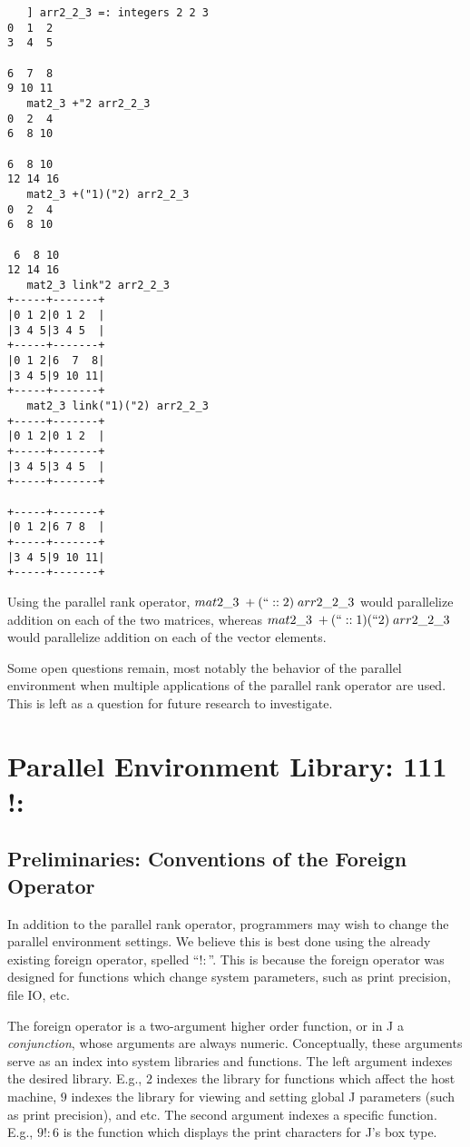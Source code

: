 \begin{singlespacing}
\begin{small}
\begin{verbatim}
   ] arr2_2_3 =: integers 2 2 3
0  1  2
3  4  5

6  7  8
9 10 11
   mat2_3 +"2 arr2_2_3
0  2  4
6  8 10

6  8 10
12 14 16
   mat2_3 +("1)("2) arr2_2_3
0  2  4
6  8 10

 6  8 10
12 14 16
   mat2_3 link"2 arr2_2_3
+-----+-------+
|0 1 2|0 1 2  |
|3 4 5|3 4 5  |
+-----+-------+
|0 1 2|6  7  8|
|3 4 5|9 10 11|
+-----+-------+
   mat2_3 link("1)("2) arr2_2_3
+-----+-------+
|0 1 2|0 1 2  |
+-----+-------+
|3 4 5|3 4 5  |
+-----+-------+

+-----+-------+
|0 1 2|6 7 8  |
+-----+-------+
|3 4 5|9 10 11|
+-----+-------+
\end{verbatim}
\end{small}
\end{singlespacing}


Using the parallel rank operator, 
$mat2\_3\;+(``::2)\;arr2\_2\_3$ would parallelize addition on each of the two matrices, whereas
$mat2\_3\;+(``::1)(``2)\;arr2\_2\_3$ would parallelize addition on each of the vector elements.

Some open questions remain, most notably 
the behavior of the parallel environment when multiple applications of the parallel rank operator are used. 
This is left as a question for future research to investigate.

\section{Parallel Environment Library: 111 !:} 
\label{pfor}
\subsection{Preliminaries: Conventions of the Foreign Operator}
In addition to the parallel rank operator, 
programmers may wish to change the parallel environment settings.
We believe this is best done using the already existing foreign operator, spelled ``$!:$''.
This is because the foreign operator was designed for functions which change system parameters, 
such as print precision, file IO, etc.\cite{jvocab} 

The foreign operator is a two-argument higher order function, or in J a \textit{conjunction}, 
whose arguments are always numeric.
Conceptually, these arguments serve as an index into system libraries and functions.
The left argument indexes the desired library.
E.g., $2$ indexes the library for functions which affect the host machine, 
$9$ indexes the library for viewing and setting global J parameters (such as print precision), and etc.
The second argument indexes a specific function.
E.g., $9!:6$ is the function which displays the print characters for J's box type.

